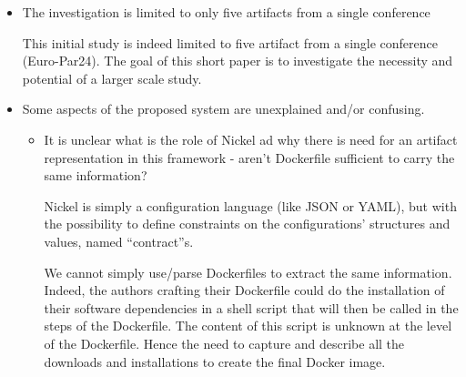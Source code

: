 \documentclass[%
	11pt,
	final,
]{article}
\begin{document}
\begin{itemize}
\item The investigation is limited to only five artifacts from a single conference

\begin{review-answer}
  This initial study is indeed limited to five artifact from a single conference (Euro-Par24).
  The goal of this short paper is to investigate the necessity and potential of a larger scale study.
\end{review-answer}

\item Some aspects of the proposed system are unexplained and/or confusing.
  \begin{itemize}
   \item It is unclear what is the role of Nickel ad why there is need for an artifact representation in this framework - aren't Dockerfile sufficient to carry the same information?
\begin{review-answer}
  Nickel is simply a configuration language (like JSON or YAML), but with the possibility to define constraints on the configurations' structures and values, named ``contract''s.

  We cannot simply use/parse Dockerfiles to extract the same information.
  Indeed, the authors crafting their Dockerfile could do the installation of their software dependencies in a shell script that will then be called in the steps of the Dockerfile.
  The content of this script is unknown at the level of the Dockerfile.
  Hence the need to capture and describe all the downloads and installations to create the final Docker image.



\end{review-answer}
\end{itemize}
\end{itemize}
\end{document}
